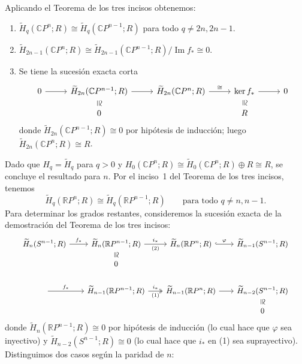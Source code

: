 \begin{dem}
Aplicando el Teorema de los tres incisos obtenemos:
\begin{enumerate}
    \item $\widetilde{H}_q(\mathbb{C}P^n; R) \cong \widetilde{H}_q(\mathbb{C}P^{n-1}; R)$ para todo $q \neq 2n, 2n - 1$.
    \item $\widetilde{H}_{2n-1}(\mathbb{C}P^n; R) \cong \widetilde{H}_{2n-1}(\mathbb{C}P^{n-1}; R) / \operatorname{Im} f_* \cong 0$.
    \item Se tiene la sucesión exacta corta
    \[
    \begin{tikzcd}[column sep=2.6em, row sep=1.0em]
    0 \arrow[r]
    & \widetilde{H}_{2n}(\mathbb{C}P^{n-1}; R)
        \arrow[r]
        \arrow[d, phantom, "\cong"{description, sloped, inner sep=1pt}]
    & \widetilde{H}_{2n}(\mathbb{C}P^n; R)
        \arrow[r, "\cong"]
    & \ker f_*
        \arrow[r]
        \arrow[d, phantom, "\cong"{description, sloped, inner sep=1pt}]
    & 0 \\
    & 0 & & R &
    \end{tikzcd}
    \]
    donde $\widetilde{H}_{2n}(\mathbb{C}P^{n-1}; R) \cong 0$ por hipótesis de inducción; luego $\widetilde{H}_{2n}(\mathbb{C}P^n; R) \cong R$.
\end{enumerate}
Dado que $H_q = \widetilde{H}_q$ para $q > 0$ y $H_0(\mathbb{C}P^n; R) \cong \widetilde{H}_0(\mathbb{C}P^n; R) \oplus R \cong R$, se concluye el resultado para $n$.
Por el inciso~1 del Teorema de los tres incisos, tenemos
\[
\widetilde{H}_q(\mathbb{R}P^n; R) \cong \widetilde{H}_q(\mathbb{R}P^{n-1}; R)
\qquad \text{para todo } q \neq n, n - 1.
\]
Para determinar los grados restantes, consideremos la sucesión exacta de la demostración del Teorema de los tres incisos:
\[
{\small
\begin{tikzcd}[column sep=1.9em, row sep=1.0em]
\widetilde{H}_n(S^{n-1}; R) \arrow[r, "f_*"]
& \widetilde{H}_n(\mathbb{R}P^{n-1}; R)
    \arrow[r, "i_*", "\text{(2)}"']
    \arrow[d, phantom, "\cong"{description, sloped, inner sep=1pt}]
& \widetilde{H}_n(\mathbb{R}P^n; R) \arrow[r, hook, "\varphi"]
& \widetilde{H}_{n-1}(S^{n-1}; R) \\
& 0 & & \\[0.8em]
{} \arrow[r, "f_*"]
& \widetilde{H}_{n-1}(\mathbb{R}P^{n-1}; R) \arrow[r, two heads, "i_*", "\text{(1)}"']
& \widetilde{H}_{n-1}(\mathbb{R}P^n; R) \arrow[r]
& \widetilde{H}_{n-2}(S^{n-1}; R)
    \arrow[d, phantom, "\cong"{description, sloped, inner sep=1pt}] \\
& & & 0
\end{tikzcd}}
\]
donde $\widetilde{H}_n(\mathbb{R}P^{n-1}; R) \cong 0$ por hipótesis de inducción (lo cual hace que $\varphi$ sea inyectivo) y $\widetilde{H}_{n-2}(S^{n-1}; R) \cong 0$ (lo cual hace que $i_*$ en (1) sea suprayectivo). Distinguimos dos casos según la paridad de $n$:


\end{dem}
